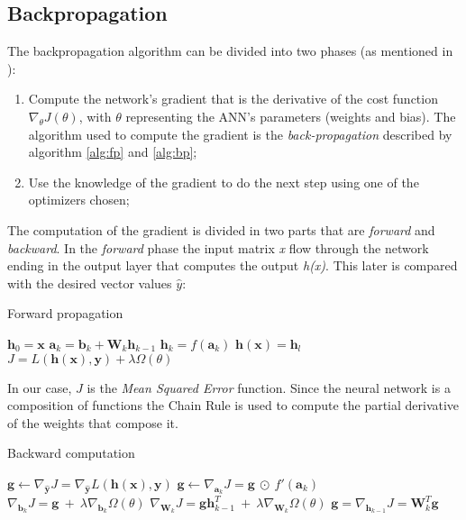 \subsection{Backpropagation}
The backpropagation algorithm can be divided into two phases (as mentioned in \cite{backpropagation}):
\begin{enumerate}
	\item Compute the network's gradient that is the derivative of the cost function
	$\nabla_{\theta} J(\theta)$, with $\theta$ representing the ANN's parameters (weights and bias). The algorithm used to compute the gradient is the \textit{back-propagation} described by
	algorithm \ref{alg:fp} and \ref{alg:bp};
	\item Use the knowledge of the gradient to do the next step using one of the optimizers chosen;
\end{enumerate}
The computation of the gradient is divided in two parts that are \textit{forward} and \textit{backward}. In the \textit{forward} phase the input matrix \textit{x} flow through the network ending in the output layer that computes the output \textit{h(x)}. This later is compared with the desired vector values $\widehat{y}$:
\begin{algorithm}[H]
	\caption{Forward propagation}
	\label{alg:fp}
	\begin{algorithmic}[1]
		\State $\mathbf{h}_{0} = \mathbf{x}$
		\State $\mathbf{a}_{k} = \mathbf{b}_{k} + \mathbf{W}_{k}\mathbf{h}_{k - 1}$
		\State $\mathbf{h}_{k} = f(\mathbf{a}_{k})$
		\EndFor
		\State $\mathbf{h(x)} = \mathbf{h}_{l}$
		\State $J = L(\mathbf{h(x)}, \mathbf{y}) + \lambda \Omega(\theta)$
		\EndProcedure
	\end{algorithmic}
\end{algorithm}
In our case, $J$ is the \textit{Mean Squared Error} function. Since the neural network is a composition of functions the Chain Rule is used to compute the partial derivative of the weights that compose it. 

\begin{algorithm}[H]
	\caption{Backward computation}
	\label{alg:bp}
	\begin{algorithmic}[2]
		\State $\mathbf{g} \leftarrow \nabla_{\hat{\mathbf{y}}}J = \nabla_{\hat{\mathbf{y}}}
		L(\mathbf{h(x)}, \mathbf{y})$
		\State $\mathbf{g} \leftarrow \nabla_{\mathbf{a}_{k}}J = \mathbf{g} \ \odot \
		f'(\mathbf{a}_{k})$
		\State $\nabla_{\mathbf{b}_{k}}J = \mathbf{g} \ + \ \lambda \nabla_{\mathbf{b}_{k}}
		\Omega(\theta)$
		\State $\nabla_{\mathbf{W}_{k}}J = \mathbf{g}\mathbf{h}_{k - 1}^{T} \ + \ \lambda
		\nabla_{\mathbf{W}_{k}} \Omega(\theta)$
		\State $\mathbf{g} = \nabla_{\mathbf{h}_{k - 1}}J = \mathbf{W}_{k}^{T}\mathbf{g}$
		\EndFor
		\EndProcedure
	\end{algorithmic}
\end{algorithm}
